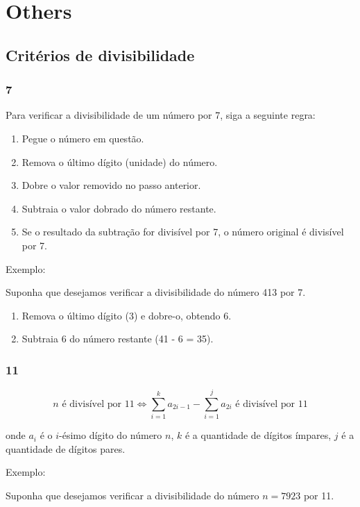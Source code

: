 \section{Others}

\subsection{Critérios de divisibilidade}


\subsubsection{7}

Para verificar a divisibilidade de um número por 7, siga a seguinte regra:

\begin{enumerate}
  \item Pegue o número em questão.
  \item Remova o último dígito (unidade) do número.
  \item Dobre o valor removido no passo anterior.
  \item Subtraia o valor dobrado do número restante.
  \item Se o resultado da subtração for divisível por 7, o número original é divisível por 7.
\end{enumerate}

Exemplo:

Suponha que desejamos verificar a divisibilidade do número 413 por 7.

\begin{enumerate}
  \item Remova o último dígito (3) e dobre-o, obtendo 6.
  \item Subtraia 6 do número restante (41 - 6 = 35).
\end{enumerate}

\subsubsection{11}

\[
n \text{ é divisível por 11} \iff \sum_{i=1}^{k} a_{2i-1} - \sum_{i=1}^{j} a_{2i} \text{ é divisível por 11}
\]

onde \(a_{i}\) é o \(i\)-ésimo dígito do número \(n\), \(k\) é a quantidade de dígitos ímpares, \(j\) é a quantidade de dígitos pares.

Exemplo:

Suponha que desejamos verificar a divisibilidade do número \(n = 7923\) por 11.

